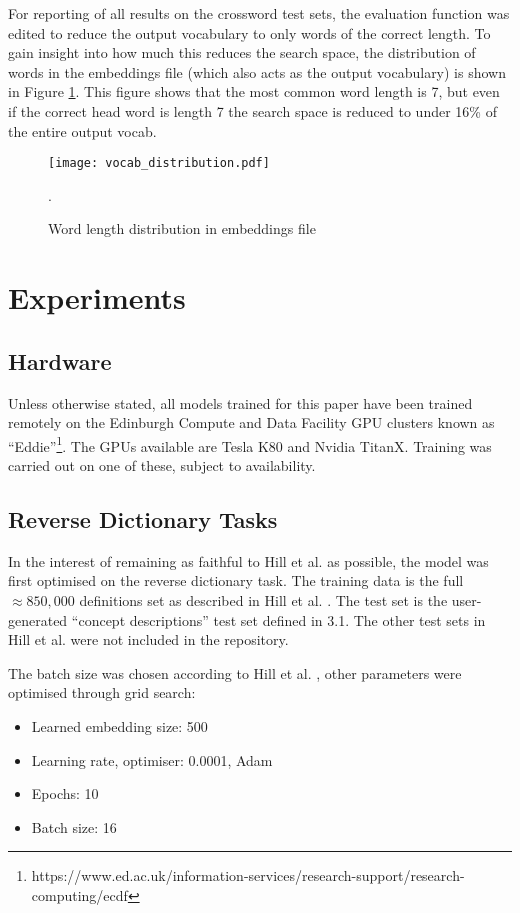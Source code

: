 \documentclass[11pt]{article}
\begin{document}
\begin{spacing}{1}
For reporting of all results on the crossword test sets, the evaluation function was edited to reduce the output vocabulary to only words of the correct length. To gain insight into how much this reduces the search space, the distribution of words in the embeddings file (which also acts as the output vocabulary) is shown in Figure \ref{vocab_distribution}. This figure shows that the most common word length is 7, but even if the correct head word is length 7 the search space is reduced to under 16\% of the entire output vocab.

\begin{figure}[!htpb]
\centering
\texttt{[image: vocab\_distribution.pdf]}
\caption{Word length distribution in embeddings file}.
\label{vocab_distribution}
\end{figure}

\section{Experiments}
\subsection{Hardware}
Unless otherwise stated, all models trained for this paper have been trained remotely on the Edinburgh Compute and Data Facility GPU clusters known as ``Eddie''\footnote{https://www.ed.ac.uk/information-services/research-support/research-computing/ecdf}. The GPUs available are Tesla K80 and Nvidia TitanX. Training was carried out on one of these, subject to availability.

\subsection{Reverse Dictionary Tasks}
In the interest of remaining as faithful to Hill et al. \citeyear{hill2015learning} as possible, the model was first optimised on the reverse dictionary task. The training data is the full $\approx850,000$ definitions set as described in Hill et al. \citeyear{hill2015learning}. The test set is the user-generated ``concept descriptions'' test set defined in 3.1. The other test sets in Hill et al. \citeyear{hill2015learning} were not included in the repository.

The batch size was chosen according to Hill et al. \citeyear{hill2015learning}, other parameters were optimised through grid search:
\begin{itemize}
\item Learned embedding size: 500
\item Learning rate, optimiser: 0.0001, Adam
\item Epochs: 10
\item Batch size: 16
\end{itemize}


\end{spacing}
\end{document}
